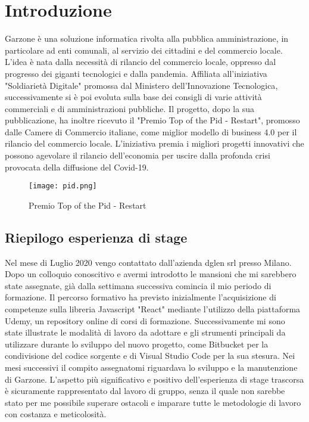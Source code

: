 \mainmatter
\chapter{Introduzione}
Garzone è una soluzione informatica rivolta alla pubblica amministrazione, in particolare ad enti comunali, al servizio dei cittadini e del commercio locale. L'idea è nata dalla necessità di rilancio del commercio locale, oppresso dal progresso dei giganti tecnologici e dalla pandemia. Affiliata all'iniziativa "Soldiarietà Digitale" promossa dal Ministero dell’Innovazione Tecnologica\cite{MISE}, successivamente si è poi evoluta sulla base dei consigli di varie attività commerciali e di amministrazioni pubbliche. Il progetto, dopo la sua pubblicazione, ha inoltre ricevuto il "Premio Top of the Pid - Restart"\cite{PID}, promosso dalle Camere di Commercio italiane, come miglior modello di business 4.0 per il rilancio del commercio locale. L’iniziativa premia i migliori progetti innovativi che possono agevolare il rilancio dell’economia per uscire dalla profonda crisi provocata della diffusione del Covid-19.
\begin{figure}[!htb]
    \centering
    \texttt{[image: pid.png]}
    \caption{Premio Top of the Pid - Restart}
\end{figure}
\section{Riepilogo esperienza di stage}
Nel mese di Luglio 2020 vengo contattato dall'azienda dglen srl presso Milano. Dopo un colloquio conoscitivo e avermi introdotto le mansioni che mi sarebbero state assegnate, già dalla settimana successiva comincia il mio periodo di formazione. Il percorso formativo ha previsto inizialmente l'acquisizione di competenze sulla libreria Javascript "React" mediante l'utilizzo della piattaforma Udemy, un repository online di corsi di formazione. Successivamente mi sono state illustrate le modalità di lavoro da adottare e gli strumenti principali da utilizzare durante lo sviluppo del nuovo progetto, come Bitbucket per la condivisione del codice sorgente e di Visual Studio Code per la sua stesura. Nei mesi successivi il compito assegnatomi riguardava lo sviluppo e la manutenzione di Garzone. L'aspetto più significativo e positivo dell'esperienza di stage trascorsa è sicuramente rappresentato dal lavoro di gruppo, senza il quale non sarebbe stato per me possibile superare ostacoli e imparare tutte le metodologie di lavoro con costanza e meticolosità.

